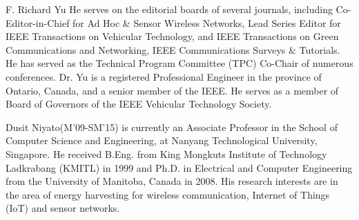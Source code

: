\documentclass[twocolumn,10pt]{IEEEtran}
\begin{document}
\begin{IEEEbiography}{F. Richard Yu}
He serves on the editorial boards of several journals, including Co-Editor-in-Chief for Ad Hoc \& Sensor Wireless Networks, Lead Series Editor for IEEE Transactions on Vehicular Technology, and IEEE Transactions on Green Communications and Networking, IEEE Communications Surveys \& Tutorials. He has served as the Technical Program Committee (TPC) Co-Chair of numerous conferences. Dr. Yu is a registered Professional Engineer in the province of Ontario, Canada, and a senior member of the IEEE. He serves as a member of Board of Governors of the IEEE Vehicular Technology Society.

\end{IEEEbiography}


\begin{IEEEbiography}{Dusit Niyato}(M'09-SM'15) is currently an Associate Professor in the School of Computer Science and Engineering, at Nanyang Technological University, Singapore. He received B.Eng. from King Mongkuts Institute of Technology Ladkrabang (KMITL) in 1999 and Ph.D. in Electrical and Computer Engineering from the University of Manitoba, Canada in 2008. His research interests are in the area of energy harvesting for wireless communication, Internet of Things (IoT) and sensor networks.
\end{IEEEbiography}
\end{document}
